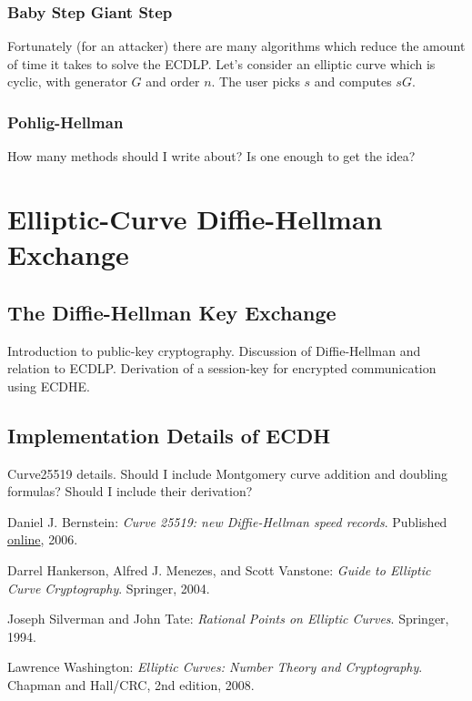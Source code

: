 \documentclass{article}
\begin{document}
\subsubsection{Baby Step Giant Step}
Fortunately (for an attacker) there are many algorithms which reduce the amount of time it takes to solve the ECDLP.
Let's consider an elliptic curve which is cyclic, with generator $G$ and order $n$.
The user picks $s$ and computes $sG$. 

\subsubsection{Pohlig-Hellman}
How many methods should I write about? Is one enough to get the idea?

\clearpage

\section{Elliptic-Curve Diffie-Hellman Exchange}

\subsection{The Diffie-Hellman Key Exchange}
Introduction to public-key cryptography.
Discussion of Diffie-Hellman and relation to ECDLP.
Derivation of a session-key for encrypted communication using ECDHE.

\subsection{Implementation Details of ECDH}
Curve25519 details.
Should I include Montgomery curve addition and doubling formulas?
Should I include their derivation?

\clearpage

\begin{thebibliography}{9}

	Daniel J. Bernstein:
	\emph{Curve 25519: new Diffie-Hellman speed records}.
	Published \href{http://cr.yp.to/ecdh/curve25519-20060209.pdf}{online},
	2006.

	Darrel Hankerson, Alfred J. Menezes, and Scott Vanstone:
	\emph{Guide to Elliptic Curve Cryptography}.
	Springer,
	2004.

	Joseph Silverman and John Tate:
	\emph{Rational Points on Elliptic Curves}.
	Springer,
	1994.

	Lawrence Washington:
	\emph{Elliptic Curves: Number Theory and Cryptography}.
	Chapman and Hall/CRC,
	2nd edition,
	2008.

\end{thebibliography}
\end{document}
